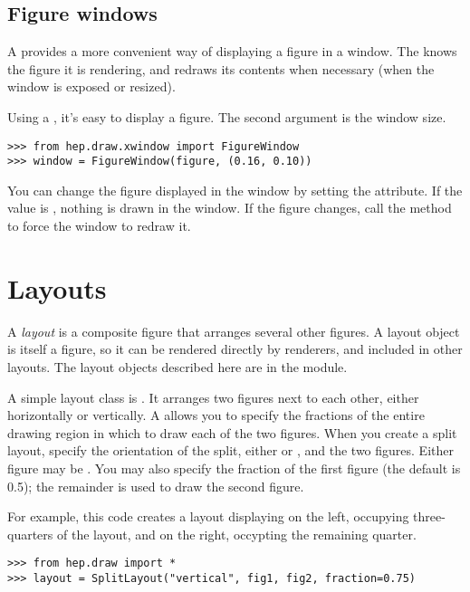 \subsection{Figure windows}

A  provides a more convenient way
of displaying a figure in a window.  The  knows the
figure it is rendering, and redraws its contents when necessary (when
the window is exposed or resized).

Using a , it's easy to display a figure.  The second
argument is the window size.
\begin{verbatim}
>>> from hep.draw.xwindow import FigureWindow
>>> window = FigureWindow(figure, (0.16, 0.10))
\end{verbatim}

You can change the figure displayed in the window by setting the
 attribute.  If the value is , nothing is
drawn in the window.  If the figure changes, call the 
method to force the window to redraw it.


\section{Layouts}

A \textit{layout} is a composite figure that arranges several other
figures.  A layout object is itself a figure, so it can be rendered
directly by renderers, and included in other layouts.  The layout
objects described here are in the  module.

A simple layout class is .  It arranges two figures
next to each other, either horizontally or vertically.  A
 allows you to specify the fractions of the entire
drawing region in which to draw each of the two figures.  When you
create a split layout, specify the orientation of the split, either
 or , and the two figures.  Either
figure may be .  You may also specify the fraction of the
first figure (the default is 0.5); the remainder is used to draw the
second figure.

For example, this code creates a layout displaying  on the
left, occupying three-quarters of the layout, and  on the
right, occypting the remaining quarter.
\begin{verbatim}
>>> from hep.draw import *
>>> layout = SplitLayout("vertical", fig1, fig2, fraction=0.75)
\end{verbatim}

